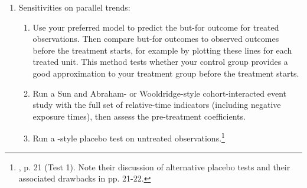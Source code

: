 \documentclass[12pt]{article}
\begin{document}
\begin{enumerate}
\begin{enumerate}
        \item Run a Sun and Abraham-style auxiliary regression (Their equation 13 following Proposition 1) to estimate TWFE treatment weights. You can also use the method from \citet{borusyak2024revisiting} Proof of Proposition 2. Assess relationships between these weights and observables such as time. This is especially useful when binning the data, as demonstrated in \citet{borusyak2024revisiting} Section 5.2.1.
         \begin{enumerate}
            \item If using a TWFE-style model, examine the weights over many subsets of the data. For example, see if certain subsets get systematically negative weight, and understand how that might bias your results. For examples of visualizations of negative weights, see \citet{jakiela2021a}, Figures 2 through 4.
        \end{enumerate}
        \item Consider whether the treatment effect may vary by other observables, and measure their effects separately if needed. For example, are certain products likely to see higher price increases from a conspiracy? Or, in a class action context, it could be that some groups of customers were not affected by the alleged conduct. While measuring many separate treatment effects can be useful, doing so to intentionally lower the precision of someone’s model is bad practice. Further, using iterated regressions to find a subset of units with no treatment effect is subject to model selection bias.
    \end{enumerate}
    \item Sensitivities on parallel trends:
    \begin{enumerate}
        \item \label{butfor-item} Use your preferred model to predict the but-for outcome for treated observations. Then compare but-for outcomes to observed outcomes before the treatment starts, for example by plotting these lines for each treated unit. This method tests whether your control group provides a good approximation to your treatment group before the treatment starts.
        \item Run a Sun and Abraham- or Wooldridge-style cohort-interacted event study with the full set of relative-time indicators (including negative exposure times), then assess the pre-treatment coefficients.
        \item Run a \citet{borusyak2024revisiting}-style placebo test on untreated observations.\footnote{\citet{borusyak2024revisiting}, p. 21 (Test 1). Note their discussion of alternative placebo tests and their associated drawbacks in pp. 21-22.
}
\end{enumerate}
\end{enumerate}
\end{document}
